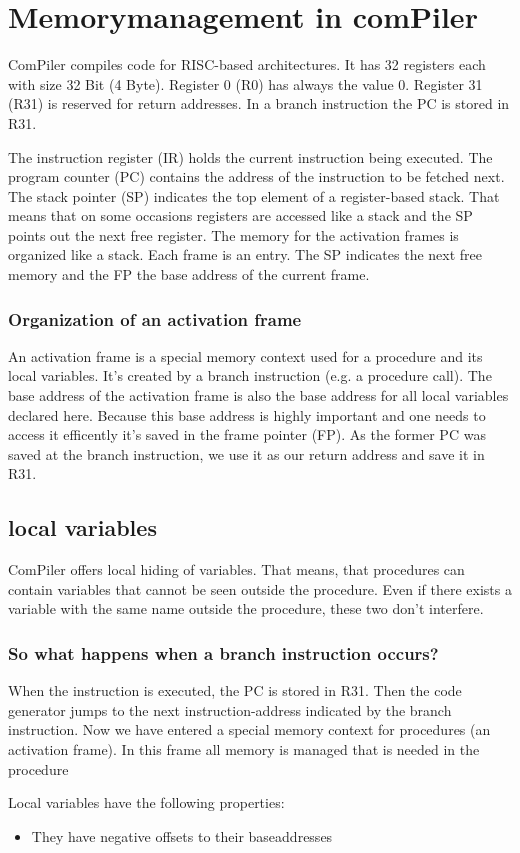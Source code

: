\section{Memorymanagement in comPiler}
ComPiler compiles code for RISC-based architectures. It has 32 registers each
with size 32 Bit (4 Byte). Register 0 (R0) has always the value 0. Register 31
(R31) is reserved for return addresses. In a branch instruction the PC is stored
in R31. 

The instruction register (IR) holds the current instruction being executed. \newline 
The program counter (PC) contains the address of the instruction to be
fetched next. \newline
The stack pointer (SP) indicates the top element of a register-based stack. That
means that on some occasions registers are accessed like a stack and the SP
points out the next free register.  
\newline
The memory for the activation frames is organized like a stack. Each frame is an
entry. The SP indicates the next free memory and the FP the base address of the
current frame. 
\subsubsection{Organization of an activation frame}
An activation frame is a special memory context used for a procedure and its
local variables. It's created by a branch instruction (e.g. a procedure call). The base address of the activation 
frame is also the base address for all local variables declared here. Because this base address is highly 
important and one needs to access it efficently it's saved in the frame pointer (FP).
As the former PC was saved at the branch instruction, we use it as our return
address and save it in R31.



\subsection{local variables}
ComPiler offers local hiding of variables. That means, that procedures can
contain variables that cannot be seen outside the procedure. Even if there
exists a variable with the same name outside the procedure, these two don't
interfere. 
\subsubsection*{So what happens when a branch instruction occurs?}
When the instruction is executed, the PC is stored in R31. Then the code
generator jumps to the next instruction-address indicated by the branch instruction.
Now we have entered a special memory context for procedures (an activation frame). In this frame all memory is 
managed that is needed in the procedure
\newline
  
 


Local variables have the following properties: 
\begin{itemize}
  \item They have negative offsets to their baseaddresses
\end{itemize}


